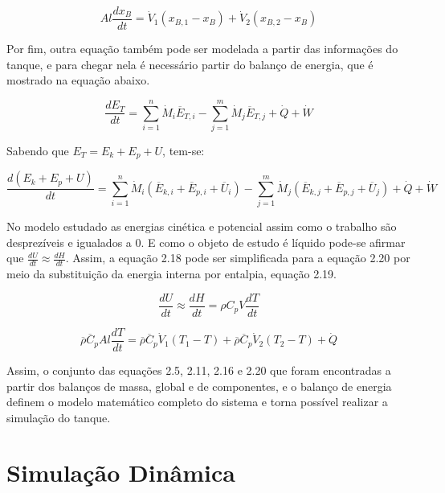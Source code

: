 \documentclass[
	12pt,				%
	openright,			%
	oneside,			%
	a4paper,			%
	english,			%
	french,				%
	spanish,			%
	brazil				%
	]{abntex2}
\begin{document}
\begin{equation}
Al\frac{dx_{B}}{dt}=\dot{V}_{1}(x_{B,1}-x_{B})+\dot{V}_{2}(x_{B,2}-x_{B})
\end{equation}

Por fim, outra equação também pode ser modelada a partir das informações do tanque, e para chegar nela é necessário partir do balanço de energia, que é mostrado na equação abaixo.

\begin{equation}
\frac{dE_{T}}{dt}=\sum\limits_{i=1}^{n}\dot{M}_{i}\overline{E}_{T,i}-\sum\limits_{j=1}^{m}\dot{M}_{j}\overline{E}_{T,j}+\dot{Q}+\dot{W}
\end{equation}

Sabendo que $E_{T}=E_{k}+E_{p}+U$, tem-se:

\begin{equation}
\frac{d(E_{k}+E_{p}+U)}{dt}=\sum\limits_{i=1}^{n}\dot{M}_{i}(\overline{E}_{k,i}+\overline{E}_{p,i}+\overline{U}_{i})-\sum\limits_{j=1}^{m}\dot{M}_{j}(\overline{E}_{k,j}+\overline{E}_{p,j}+\overline{U}_{j})+\dot{Q}+\dot{W}
\end{equation}

No modelo estudado as energias cinética e potencial assim como o trabalho são desprezíveis e igualados a 0. E como o objeto de estudo é líquido pode-se afirmar que $\frac{dU}{dt}\approx\frac{dH}{dt}$. Assim, a equação 2.18 pode ser simplificada para a equação 2.20 por meio da substituição da energia interna por entalpia, equação 2.19.

\begin{equation}
\frac{dU}{dt}\approx\frac{dH}{dt}=\rho C_{p}V\frac{dT}{dt}
\end{equation}

\begin{equation}
\overline{\rho}\overline{C}_{p}Al\frac{dT}{dt}=\overline{\rho}\overline{C}_{p}\dot{V}_{1}(T_{1}-T)+\overline{\rho}\overline{C}_{p}\dot{V}_{2}(T_{2}-T)+\dot{Q}
\end{equation}

Assim, o conjunto das equações 2.5, 2.11, 2.16 e 2.20 que foram encontradas a partir dos balanços de massa, global e de componentes, e o balanço de energia definem o modelo matemático completo do sistema e torna possível realizar a simulação do tanque.

\newpage
\chapter{Simulação Dinâmica}
\pagestyle{fancy}
\end{document}
